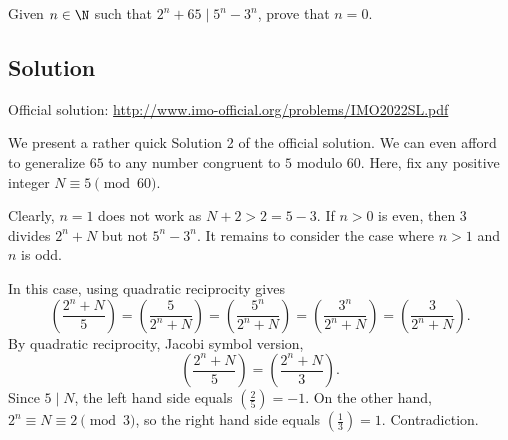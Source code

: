 Given $n \in \N$ such that $2^n + 65 \mid 5^n - 3^n$, prove that $n = 0$.



\subsection*{Solution}

Official solution: \url{http://www.imo-official.org/problems/IMO2022SL.pdf}

We present a rather quick Solution 2 of the official solution.
We can even afford to generalize $65$ to any number congruent to $5$ modulo $60$.
Here, fix any positive integer $N \equiv 5 \pmod{60}$.

Clearly, $n = 1$ does not work as $N + 2 > 2 = 5 - 3$.
If $n > 0$ is even, then $3$ divides $2^n + N$ but not $5^n - 3^n$.
It remains to consider the case where $n > 1$ and $n$ is odd.

In this case, using quadratic reciprocity gives
\[ \left(\frac{2^n + N}{5}\right) = \left(\frac{5}{2^n + N}\right) = \left(\frac{5^n}{2^n + N}\right) = \left(\frac{3^n}{2^n + N}\right) = \left(\frac{3}{2^n + N}\right). \]
By quadratic reciprocity, Jacobi symbol version,
\[ \left(\frac{2^n + N}{5}\right) = \left(\frac{2^n + N}{3}\right). \]
Since $5 \mid N$, the left hand side equals $\left(\frac{2}{5}\right) = -1$.
On the other hand, $2^n \equiv N \equiv 2 \pmod{3}$, so the right hand side equals $\left(\frac{1}{3}\right) = 1$.
Contradiction.
